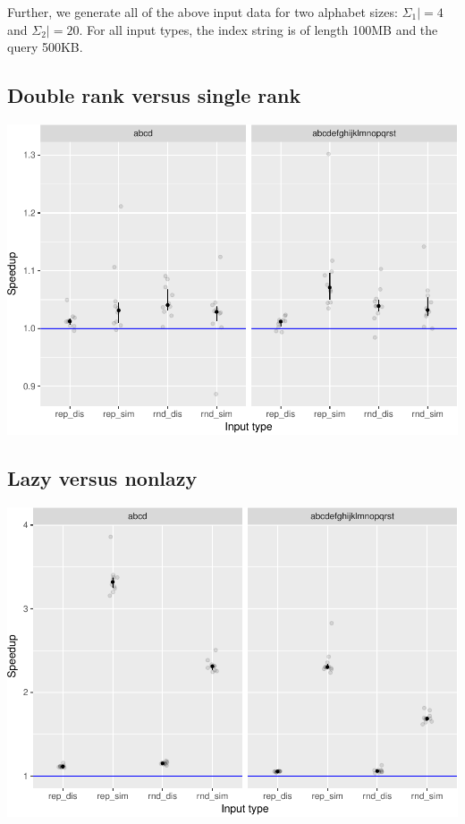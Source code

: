 \documentclass[]{article}
\begin{document}
Further, we generate all of the above input data for two alphabet sizes:
\(\Sigma_1| = 4\) and \(\Sigma_2| = 20\). For all input types, the index
string is of length 100MB and the query 500KB.

\subsection{Double rank versus single
rank}\label{double-rank-versus-single-rank}

\includegraphics{sea_2018_files/figure-latex/drank_plot_better-1.pdf}

\subsection{Lazy versus nonlazy}\label{lazy-versus-nonlazy}

\includegraphics{sea_2018_files/figure-latex/lazy_plot-1.pdf}
\end{document}
